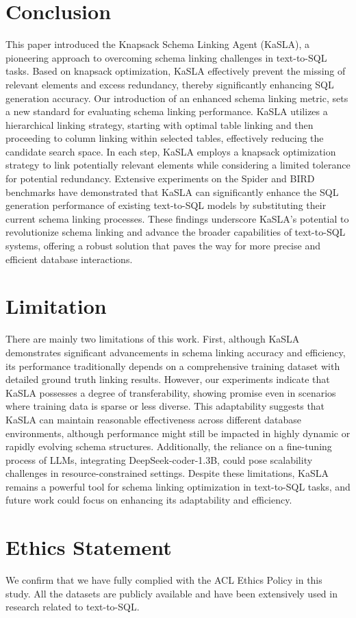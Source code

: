



   
\section{Conclusion}
\label{sec:Conclusion}
This paper introduced the Knapsack Schema Linking Agent (KaSLA), a pioneering approach to overcoming schema linking challenges in text-to-SQL tasks. Based on knapsack optimization, KaSLA effectively prevent the missing of relevant elements and excess redundancy, thereby significantly enhancing SQL generation accuracy. Our introduction of an enhanced schema linking metric, sets a new standard for evaluating schema linking performance.
KaSLA utilizes a hierarchical linking strategy, starting with optimal table linking and then proceeding to column linking within selected tables, effectively reducing the candidate search space. In each step, KaSLA employs a knapsack optimization strategy to link potentially relevant elements while considering a limited tolerance for potential redundancy. Extensive experiments on the Spider and BIRD benchmarks have demonstrated that KaSLA can significantly enhance the SQL generation performance of existing text-to-SQL models by substituting their current schema linking processes. These findings underscore KaSLA's potential to revolutionize schema linking and advance the broader capabilities of text-to-SQL systems, offering a robust solution that paves the way for more precise and efficient database interactions.


\section{Limitation} \label{sec: Limitation}
There are mainly two limitations of this work. First, although KaSLA demonstrates significant advancements in schema linking accuracy and efficiency, its performance traditionally depends on a comprehensive training dataset with detailed ground truth linking results. However, our experiments indicate that KaSLA possesses a degree of transferability, showing promise even in scenarios where training data is sparse or less diverse. This adaptability suggests that KaSLA can maintain reasonable effectiveness across different database environments, although performance might still be impacted in highly dynamic or rapidly evolving schema structures. Additionally, the reliance on a fine-tuning process of LLMs, integrating DeepSeek-coder-1.3B, could pose scalability challenges in resource-constrained settings. Despite these limitations, KaSLA remains a powerful tool for schema linking optimization in text-to-SQL tasks, and future work could focus on enhancing its adaptability and efficiency.
   
\section{Ethics Statement}
We confirm that we have fully complied with the ACL Ethics Policy in this study. All the datasets are publicly available and have been extensively used in research related to text-to-SQL.